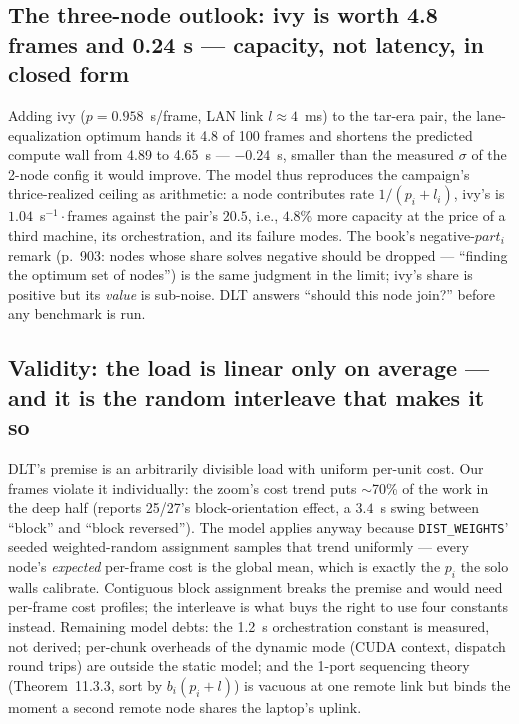 \documentclass[
	english,
	letterpaper, oneside
]{article}
\begin{document}
\subsection{The three-node outlook: ivy is worth 4.8 frames and 0.24 s --- capacity, not latency, in closed form}
\label{sec:threenode}

Adding ivy ($p = 0.958$~s/frame, LAN link $l \approx 4$~ms) to the
tar-era pair, the lane-equalization optimum hands it 4.8 of 100 frames
and shortens the predicted compute wall from 4.89 to 4.65~s ---
$-0.24$~s, smaller than the measured $\sigma$ of the 2-node config it
would improve. The model thus reproduces the campaign's thrice-realized
ceiling as arithmetic: a node contributes rate
$1/(p_i + l_i)$, ivy's is $1.04$~s$^{-1}\cdot$frames against the pair's
$20.5$, i.e., $4.8\%$ more capacity at the price of a third machine, its
orchestration, and its failure modes. The book's negative-$part_i$
remark (p.~903: nodes whose share solves negative should be dropped ---
``finding the optimum set of nodes'') is the same judgment in the limit;
ivy's share is positive but its \emph{value} is sub-noise. DLT answers
``should this node join?'' before any benchmark is run.

\subsection{Validity: the load is linear only on average --- and it is the random interleave that makes it so}
\label{sec:validity}

DLT's premise is an arbitrarily divisible load with uniform per-unit
cost. Our frames violate it individually: the zoom's cost trend puts
$\sim$70\% of the work in the deep half (reports 25/27's block-orientation
effect, a $3.4$~s swing between ``block'' and ``block reversed''). The
model applies anyway because \texttt{DIST\_WEIGHTS}' seeded
weighted-random assignment samples that trend uniformly --- every node's
\emph{expected} per-frame cost is the global mean, which is exactly the
$p_i$ the solo walls calibrate. Contiguous block assignment breaks the
premise and would need per-frame cost profiles; the interleave is what
buys the right to use four constants instead. Remaining model debts:
the 1.2~s orchestration constant is measured, not derived; per-chunk
overheads of the dynamic mode (CUDA context, dispatch round trips) are
outside the static model; and the 1-port sequencing theory
(Theorem~11.3.3, sort by $b_i(p_i + l)$) is vacuous at one remote link
but binds the moment a second remote node shares the laptop's uplink.
\end{document}
